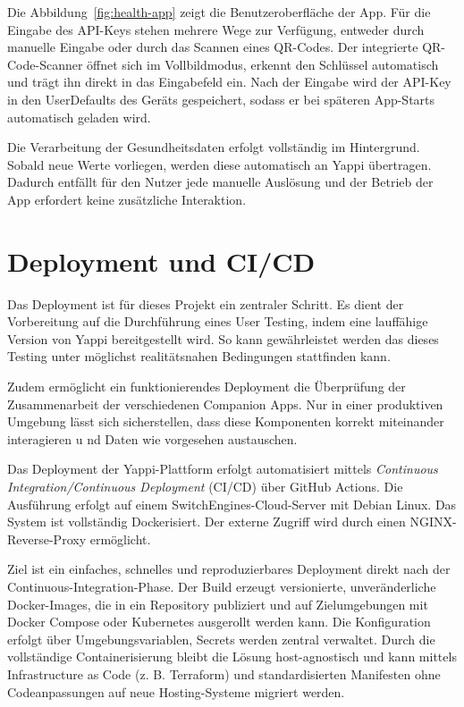 \documentclass[12pt,a4paper]{report}
\begin{document}
Die Abbildung~\ref{fig:health-app} zeigt die Benutzeroberfläche der App. Für die Eingabe des API-Keys stehen mehrere Wege zur
Verfügung, entweder durch manuelle Eingabe oder durch das Scannen eines QR-Codes. Der integrierte QR-Code-Scanner öffnet sich im
Vollbildmodus, erkennt den Schlüssel automatisch und trägt ihn direkt in das Eingabefeld ein. Nach der Eingabe wird der API-Key
in den UserDefaults des Geräts gespeichert, sodass er bei späteren App-Starts automatisch geladen wird.

Die Verarbeitung der Gesundheitsdaten erfolgt vollständig im Hintergrund. Sobald neue Werte vorliegen, werden diese automatisch an
Yappi übertragen. Dadurch entfällt für den Nutzer jede manuelle Auslösung und der Betrieb der App erfordert keine zusätzliche
Interaktion.


\section{Deployment und CI/CD}

    Das Deployment ist für dieses Projekt ein zentraler Schritt.
    Es dient der Vorbereitung auf die Durchführung eines User Testing, indem eine lauffähige Version von Yappi
    bereitgestellt wird. So kann gewährleistet werden das dieses Testing unter möglichst realitätsnahen Bedingungen stattfinden kann.

    Zudem ermöglicht ein funktionierendes Deployment die Überprüfung der Zusammenarbeit der verschiedenen Companion Apps.
    Nur in einer produktiven Umgebung lässt sich sicherstellen, dass diese Komponenten korrekt miteinander interagieren u
    nd Daten wie vorgesehen austauschen.

    Das Deployment der Yappi-Plattform erfolgt automatisiert mittels \textit{Continuous Integration/Continuous Deployment}
    (CI/CD) über GitHub Actions. Die Ausführung erfolgt auf einem SwitchEngines-Cloud-Server mit Debian Linux.
    Das System ist vollständig Dockerisiert. Der externe Zugriff wird durch einen NGINX-Reverse-Proxy ermöglicht.

    Ziel ist ein einfaches, schnelles und reproduzierbares Deployment direkt nach der Continuous-Integration-Phase.
    Der Build erzeugt versionierte, unveränderliche Docker-Images, die in ein Repository publiziert und auf
    Zielumgebungen mit Docker Compose oder Kubernetes ausgerollt werden kann. Die Konfiguration erfolgt über
    Umgebungsvariablen, Secrets werden zentral verwaltet. Durch die vollständige Containerisierung bleibt die Lösung
    host-agnostisch und kann mittels Infrastructure as Code (z. B. Terraform) und standardisierten Manifesten
    ohne Codeanpassungen auf neue Hosting-Systeme migriert werden.
\end{document}
